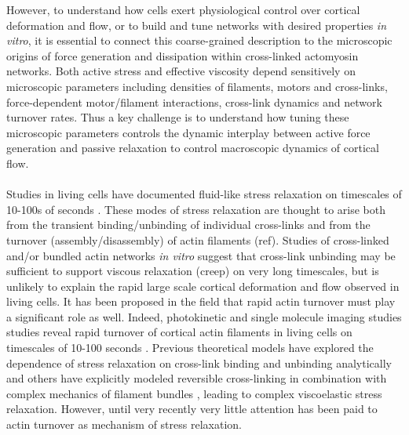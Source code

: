 \documentclass[10pt,letterpaper]{article}
\begin{document}
However, to understand how cells exert physiological control over cortical deformation and flow, or to build and tune networks with desired properties {\em in vitro}, it is essential to connect this coarse-grained description to the microscopic origins of force generation and dissipation within cross-linked actomyosin networks.  Both active stress and effective viscosity depend sensitively on microscopic parameters including densities of filaments, motors and cross-links, force-dependent motor/filament interactions, cross-link dynamics and network turnover rates.  Thus a key challenge is to understand how tuning these microscopic parameters controls the dynamic interplay between active force generation and passive relaxation to control macroscopic dynamics of cortical flow.

\paragraph{} Studies in living cells have documented fluid-like stress relaxation on timescales of 10-100s of seconds \cite{cellmech_flows,cellmech_flows2,cellmech_flows3,rheo_fluid,rheo_fluid2,cell_rheo_exp}.  These modes of stress relaxation are thought to arise both from the transient binding/unbinding of individual cross-links and from the turnover (assembly/disassembly) of actin filaments (ref).  Studies of cross-linked and/or bundled actin networks {\em in vitro} suggest that cross-link unbinding may be sufficient to support viscous relaxation (creep) on very long timescales\cite{rheo_crosslinksmatter,rheo_crosslinkslip1,rheo_crosslinkslip2,rheo_crosslinkslip3,rheo_nonaffine}, but is unlikely to explain the rapid large scale cortical deformation and flow observed in living cells.  It has been proposed in the field that rapid actin turnover must play a significant role as well. Indeed, photokinetic and single molecule imaging studies studies reveal rapid turnover of cortical actin filaments in living cells on timescales of 10-100 seconds \cite{Robin:2014aa}. Previous theoretical models have explored  the dependence of stress relaxation on cross-link binding and unbinding analytically \cite{theo_crosslinkslip1,theo_crosslinkslip2} and others have explicitly modeled reversible cross-linking in combination with complex mechanics of filament bundles \cite{model_taeyoon,rheo_crosslinkslip2,theo_crosslinkslip3}, leading to complex viscoelastic stress relaxation.  However, until very recently \cite{Mak:2016aa} very little attention has been paid to actin turnover as mechanism of stress relaxation. 
\end{document}
